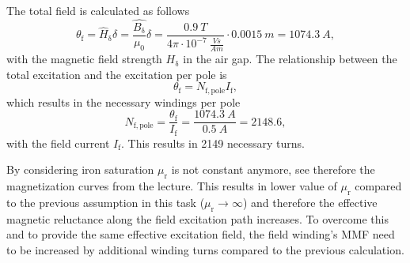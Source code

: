 \begin{solutionblock}
    The total field is calculated as follows
    \begin{equation}
        \theta_{\mathrm{f}} = \hat{H}_{\updelta} \delta
        = \frac{\hat{B_{\updelta}}}{\mu_{\mathrm{0}}} \delta
        = \frac{0.9 \ \si{T}}{4\pi \cdot 10^{-7} \ \si{\frac{Vs}{Am}}} \cdot 0.0015 \ \si{m}
        = 1074.3 \ \si{A},
    \end{equation}
    with the magnetic field strength $H_{\updelta}$ in the air gap. The relationship between the total excitation and the excitation per pole is
    \begin{equation}
        \theta_{\mathrm{f}} = N_{\mathrm{f,pole}} I_{\mathrm{f}},
    \end{equation}
    which results in the necessary windings per pole
    \begin{equation}
        N_{\mathrm{f,pole}} = \frac{\theta_{\mathrm{f}}}{I_{\mathrm{f}}}
        = \frac{1074.3 \ \si{A}}{0.5 \ \si{A}}
        = 2148.6,
    \end{equation}
    with the field current $I_{\mathrm{f}}$. This results in 2149 necessary turns.

    By considering iron saturation $\mu_{\mathrm{r}}$ is not constant anymore, see therefore the magnetization curves from the lecture.
    This results in lower value of $\mu_{\mathrm{r}}$ compared to the previous assumption in this task ($\mu_{\mathrm{r}}\rightarrow \infty$) and therefore the effective magnetic reluctance along the field excitation path increases. To overcome this and to provide the same effective excitation field, the field winding's MMF need to be increased by additional winding turns compared to the previous calculation.

\end{solutionblock}



